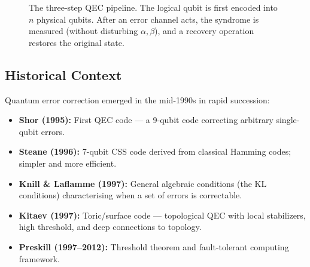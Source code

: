 \documentclass[11pt, a4paper]{article}
\theoremstyle{definition}
\theoremstyle{plain}
\theoremstyle{remark}
\begin{document}
\begin{figure}[H]
\centering
{}
\caption{The three-step QEC pipeline.  The logical qubit is first encoded into
$n$ physical qubits.  After an error channel acts, the syndrome is measured
(without disturbing $\alpha,\beta$), and a recovery operation restores the
original state.}
\label{fig:qec-pipeline}
\end{figure}

\subsection{Historical Context}

Quantum error correction emerged in the mid-1990s in rapid succession:

\begin{itemize}
  \item \textbf{Shor (1995):} First QEC code --- a 9-qubit code correcting
        arbitrary single-qubit errors.
  \item \textbf{Steane (1996):} 7-qubit CSS code derived from classical
        Hamming codes; simpler and more efficient.
  \item \textbf{Knill \& Laflamme (1997):} General algebraic conditions
        (the KL conditions) characterising when a set of errors is
        correctable.
  \item \textbf{Kitaev (1997):} Toric/surface code --- topological QEC with
        local stabilizers, high threshold, and deep connections to topology.
  \item \textbf{Preskill (1997--2012):} Threshold theorem and fault-tolerant
        computing framework.
\end{itemize}
\end{document}
